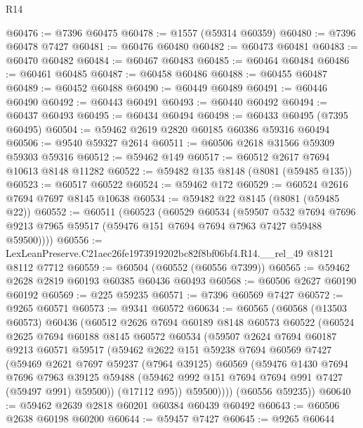 \begin{lexlean}{R14}
\begin{coremodule}
@60476 := @7396 @60475
@60478 := @1557 (@59314 @60359)
@60480 := @7396 @60478 @7427
@60481 := @60476 @60480
@60482 := @60473 @60481
@60483 := @60470 @60482
@60484 := @60467 @60483
@60485 := @60464 @60484
@60486 := @60461 @60485
@60487 := @60458 @60486
@60488 := @60455 @60487
@60489 := @60452 @60488
@60490 := @60449 @60489
@60491 := @60446 @60490
@60492 := @60443 @60491
@60493 := @60440 @60492
@60494 := @60437 @60493
@60495 := @60434 @60494
@60498 := @60433 @60495 (@7395 @60495)
@60504 := @59462 @2619 @2820 @60185 @60386 @59316 @60494
@60506 := @9540 @59327 @2614
@60511 := @60506 @2618 @31566 @59309 @59303 @59316
@60512 := @59462 @149
@60517 := @60512 @2617 @7694 @10613 @8148 @11282
@60522 := @59482 @135 @8148 (@8081 (@59485 @135))
@60523 := @60517 @60522
@60524 := @59462 @172
@60529 := @60524 @2616 @7694 @7697 @8145 @10638
@60534 := @59482 @22 @8145 (@8081 (@59485 @22))
@60552 := @60511
    (@60523
      (@60529
        @60534
        (@59507
          @532
          @7694
          @7696
          @9213
          @7965
          @59517
          (@59476 @151 @7694 @7694 @7963 @7427 @59488 @59500))))
@60556 := LexLeanPreserve.C21aec26fe1973919202bc82f8bf06bf4.R14.__rel_49 @8121 @8112 @7712
@60559 := @60504 (@60552 (@60556 @7399))
@60565 := @59462 @2628 @2819 @60193 @60385 @60436 @60493
@60568 := @60506 @2627 @60190 @60192
@60569 := @225 @59235
@60571 := @7396 @60569 @7427
@60572 := @9265 @60571
@60573 := @9341 @60572
@60634 := @60565
    (@60568
      (@13503 @60573)
      @60436
      (@60512
        @2626
        @7694
        @60189
        @8148
        @60573
        @60522
        (@60524
          @2625
          @7694
          @60188
          @8145
          @60572
          @60534
          (@59507
            @2624
            @7694
            @60187
            @9213
            @60571
            @59517
            (@59462
              @2622
              @151
              @59238
              @7694
              @60569
              @7427
              (@59469
                @2621
                @7697
                @59237
                (@7964 @39125)
                @60569
                (@59476
                  @1430
                  @7694
                  @7696
                  @7963
                  @39125
                  @59488
                  (@59462 @992 @151 @7694 @7694 @991 @7427 (@59497 @991) @59500))
                (@17112 @95))
              @59500))))
      (@60556 @59235))
@60640 := @59462 @2639 @2818 @60201 @60384 @60439 @60492
@60643 := @60506 @2638 @60198 @60200
@60644 := @59457 @7427
@60645 := @9265 @60644

\end{coremodule}
\end{lexlean}
